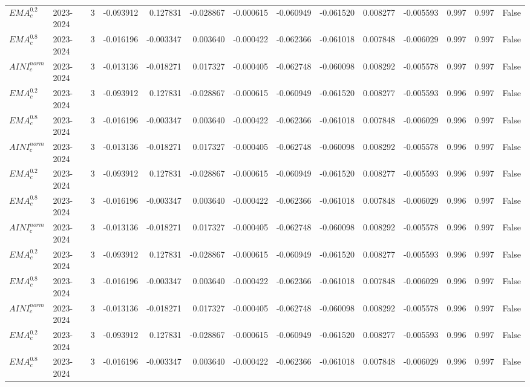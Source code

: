 \begin{tabular}{@{}llrrrrrrrrrlll@{}}
$EMA^{0.2}_{c}$ & 2023-2024 & 3 & -0.093912 & 0.127831 & -0.028867 & -0.000615 & -0.060949 & -0.061520 & 0.008277 & -0.005593 & 0.997 & 0.997 & False \\
$EMA^{0.8}_{c}$ & 2023-2024 & 3 & -0.016196 & -0.003347 & 0.003640 & -0.000422 & -0.062366 & -0.061018 & 0.007848 & -0.006029 & 0.997 & 0.997 & False \\
$AINI^{norm}_{c}$ & 2023-2024 & 3 & -0.013136 & -0.018271 & 0.017327 & -0.000405 & -0.062748 & -0.060098 & 0.008292 & -0.005578 & 0.997 & 0.997 & False \\
$EMA^{0.2}_{c}$ & 2023-2024 & 3 & -0.093912 & 0.127831 & -0.028867 & -0.000615 & -0.060949 & -0.061520 & 0.008277 & -0.005593 & 0.996 & 0.997 & False \\
$EMA^{0.8}_{c}$ & 2023-2024 & 3 & -0.016196 & -0.003347 & 0.003640 & -0.000422 & -0.062366 & -0.061018 & 0.007848 & -0.006029 & 0.996 & 0.997 & False \\
$AINI^{norm}_{c}$ & 2023-2024 & 3 & -0.013136 & -0.018271 & 0.017327 & -0.000405 & -0.062748 & -0.060098 & 0.008292 & -0.005578 & 0.996 & 0.997 & False \\
$EMA^{0.2}_{c}$ & 2023-2024 & 3 & -0.093912 & 0.127831 & -0.028867 & -0.000615 & -0.060949 & -0.061520 & 0.008277 & -0.005593 & 0.996 & 0.997 & False \\
$EMA^{0.8}_{c}$ & 2023-2024 & 3 & -0.016196 & -0.003347 & 0.003640 & -0.000422 & -0.062366 & -0.061018 & 0.007848 & -0.006029 & 0.996 & 0.997 & False \\
$AINI^{norm}_{c}$ & 2023-2024 & 3 & -0.013136 & -0.018271 & 0.017327 & -0.000405 & -0.062748 & -0.060098 & 0.008292 & -0.005578 & 0.996 & 0.997 & False \\
$EMA^{0.2}_{c}$ & 2023-2024 & 3 & -0.093912 & 0.127831 & -0.028867 & -0.000615 & -0.060949 & -0.061520 & 0.008277 & -0.005593 & 0.996 & 0.997 & False \\
$EMA^{0.8}_{c}$ & 2023-2024 & 3 & -0.016196 & -0.003347 & 0.003640 & -0.000422 & -0.062366 & -0.061018 & 0.007848 & -0.006029 & 0.996 & 0.997 & False \\
$AINI^{norm}_{c}$ & 2023-2024 & 3 & -0.013136 & -0.018271 & 0.017327 & -0.000405 & -0.062748 & -0.060098 & 0.008292 & -0.005578 & 0.996 & 0.997 & False \\
$EMA^{0.2}_{c}$ & 2023-2024 & 3 & -0.093912 & 0.127831 & -0.028867 & -0.000615 & -0.060949 & -0.061520 & 0.008277 & -0.005593 & 0.996 & 0.997 & False \\
$EMA^{0.8}_{c}$ & 2023-2024 & 3 & -0.016196 & -0.003347 & 0.003640 & -0.000422 & -0.062366 & -0.061018 & 0.007848 & -0.006029 & 0.996 & 0.997 & False \\

\end{tabular}
